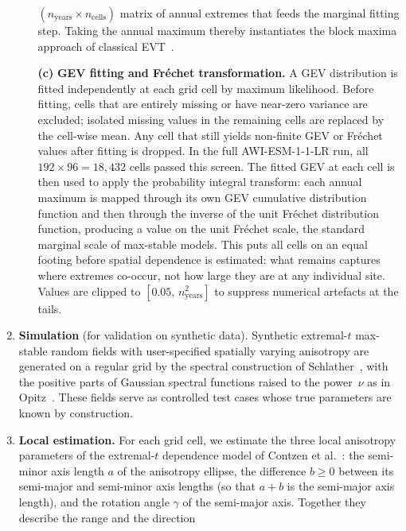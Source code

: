 \documentclass[preprint,12pt,a4paper]{elsarticle}
\newcommand{\rev}[1]{{#1}}
\newcommand{\revr}[1]{{#1}}
\newcommand{\revt}[1]{{#1}}
\begin{document}
\begin{enumerate}
\begin{enumerate}
{    $(n_{\text{years}} \times n_{\text{cells}})$ matrix of annual
    extremes that feeds the marginal fitting step. \revt{Taking the
    annual maximum thereby instantiates} the \revt{block maxima}
    approach of classical EVT~\cite{dehaan2006}.}
  \item[\textbf{(c)}] \textbf{\rev{GEV fitting and Fr\'{e}chet
    transformation.}}
    \rev{A GEV distribution is fitted independently at each grid cell
    by maximum likelihood. Before fitting, cells that are entirely
    missing or have near-zero variance are excluded; isolated missing
    values in the remaining cells are replaced by the cell-wise mean.
    Any cell that still yields non-finite GEV or Fr\'{e}chet values
    after fitting is dropped. In the full AWI-ESM-1-1-LR run, all
    $192 \times 96 = 18{,}432$ cells passed this screen. The fitted
    GEV at each cell is then used to apply the probability integral
    transform: each annual maximum is mapped through its own GEV
    cumulative distribution function and then through the inverse of
    the unit Fr\'{e}chet distribution function, producing a value on
    the unit Fr\'{e}chet scale, the standard marginal scale of
    max-stable models.
    \revr{This puts all cells on an equal footing before spatial
    dependence is estimated: what remains captures where extremes
    co-occur, not how large they are at any individual site.}
    Values are clipped to $[0.05,\, n_{\text{years}}^{2}]$ to
    suppress numerical artefacts at the tails.}
  \end{enumerate}
\item \textbf{Simulation} (for validation on synthetic data).
  Synthetic extremal-$t$ max-stable random fields with
  user-specified spatially varying anisotropy are generated on a
  regular grid by the spectral construction of
  Schlather~\cite{schlather2002}, with the positive parts of
  Gaussian spectral functions raised to the power~$\nu$ as in
  Opitz~\cite{opitz2013}. These fields serve as controlled test cases whose
  true parameters are known by construction.
\item \textbf{Local estimation.}
  For each grid cell, we estimate the three local anisotropy
  parameters of the extremal-$t$ dependence model of Contzen
  et al.~\cite{contzen2025,opitz2013}: the semi-minor axis length $a$
  of the anisotropy ellipse, the difference $b \ge 0$ between its
  semi-major and semi-minor axis lengths (so that $a+b$ is the
  semi-major axis length), and the rotation angle $\gamma$ of the
  semi-major axis. Together they describe the range and the direction

\end{enumerate}
\end{document}
